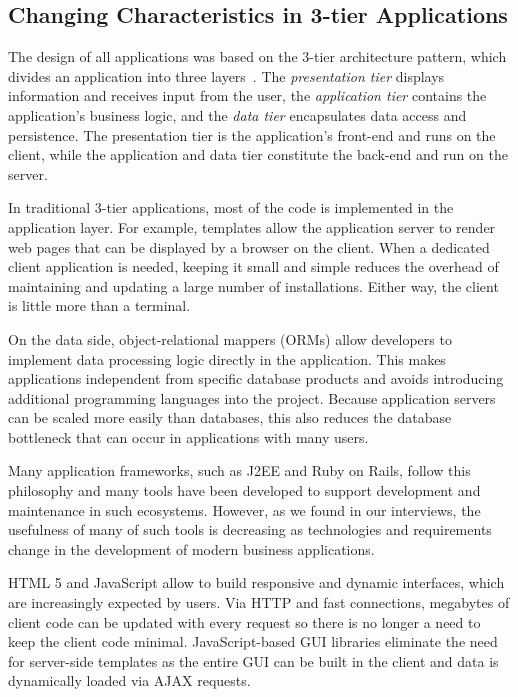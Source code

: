 \subsection{Changing Characteristics in 3-tier Applications}

The design of all applications was based on the 3-tier architecture pattern, which divides an application into three layers~\cite{eckerson95:three_tier_clientserver_architecture}.
The \emph{presentation tier} displays information and receives input from the user,
the \emph{application tier} contains the application's business logic, and
the \emph{data tier} encapsulates data access and persistence.
The presentation tier is the application's front-end and runs on the client, while the application and data tier constitute the back-end and run on the server.

In traditional 3-tier applications, most of the code is implemented in the application layer.
For example, templates allow the application server to render web pages that can be displayed by a browser on the client.
When a dedicated client application is needed, keeping it small and simple reduces the overhead of maintaining and updating a large number of installations.
Either way, the client is little more than a terminal.

On the data side, object-relational mappers (ORMs) allow developers to implement data processing logic directly in the application.
This makes applications independent from specific database products and avoids introducing additional programming languages into the project.
Because application servers can be scaled more easily than databases, this also reduces the database bottleneck that can occur in applications with many users.

Many application frameworks, such as J2EE and Ruby on Rails, follow this philosophy and many tools have been developed to support development and maintenance in such ecosystems.
However, as we found in our interviews, the usefulness of many of such tools is decreasing as technologies and requirements change in the development of modern business applications.

HTML 5 and JavaScript allow to build responsive and dynamic interfaces, which are increasingly expected by users.
Via HTTP and fast connections, megabytes of client code can be updated with every request so there is no longer a need to keep the client code minimal.
JavaScript-based GUI libraries eliminate the need for server-side templates as the entire GUI can be built in the client and data is dynamically loaded via AJAX requests.

